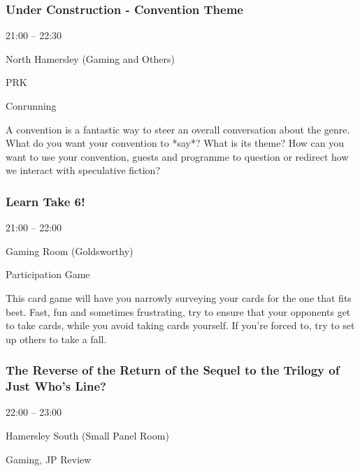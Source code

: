 \documentclass{scrreprt}
\begin{document}
\begin{multicols}{2}
\subsubsection*{Under Construction - Convention Theme}\begin{description}
\setlength{\itemsep}{0pt}
\setlength{\parsep}{0pt}
\setlength{\parskip}{0pt}
\item[Time:]{21:00 -- 22:30}
\item[Venue:]{North Hamersley (Gaming and Others)}
\item[People:]{PRK}
\item[Tags:]{Conrunning}\end{description}
A convention is a fantastic way to steer an overall conversation about the genre. What do you want your convention to *say*? What is its theme? How can you want to use your convention, guests and programme to question or redirect how we interact with speculative fiction?
\subsubsection*{Learn Take 6!}\begin{description}
\setlength{\itemsep}{0pt}
\setlength{\parsep}{0pt}
\setlength{\parskip}{0pt}
\item[Time:]{21:00 -- 22:00}
\item[Venue:]{Gaming Room (Goldsworthy)}
\item[Tags:]{Participation Game}\end{description}
This card game will have you narrowly surveying your cards for the one that fits best. Fast, fun and sometimes frustrating, try to ensure that your opponents get to take cards, while you avoid taking cards yourself. If you're forced to, try to set up others to take a fall.
\subsubsection*{The Reverse of the Return of the Sequel to the Trilogy of Just Who's Line?}\begin{description}
\setlength{\itemsep}{0pt}
\setlength{\parsep}{0pt}
\setlength{\parskip}{0pt}
\item[Time:]{22:00 -- 23:00}
\item[Venue:]{Hamersley South (Small Panel Room)}
\item[Tags:]{Gaming, JP Review}\end{description}


\end{multicols}
\end{document}
